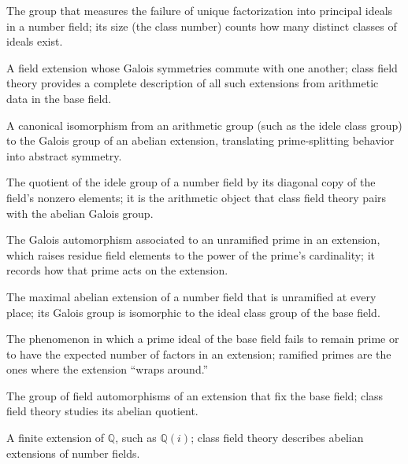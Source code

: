 \begin{description}[leftmargin=*,style=nextline,itemsep=0.3em]

\item[\textbf{Ideal class group.}] The group that measures the failure of unique factorization into principal ideals in a number field; its size (the class number) counts how many distinct classes of ideals exist.

\item[\textbf{Abelian extension.}] A field extension whose Galois symmetries commute with one another; class field theory provides a complete description of all such extensions from arithmetic data in the base field.

\item[\textbf{Reciprocity map.}] A canonical isomorphism from an arithmetic group (such as the idele class group) to the Galois group of an abelian extension, translating prime-splitting behavior into abstract symmetry.

\item[\textbf{Idele class group.}] The quotient of the idele group of a number field by its diagonal copy of the field's nonzero elements; it is the arithmetic object that class field theory pairs with the abelian Galois group.

\item[\textbf{Frobenius automorphism.}] The Galois automorphism associated to an unramified prime in an extension, which raises residue field elements to the power of the prime's cardinality; it records how that prime acts on the extension.

\item[\textbf{Hilbert class field.}] The maximal abelian extension of a number field that is unramified at every place; its Galois group is isomorphic to the ideal class group of the base field.

\item[\textbf{Ramification.}] The phenomenon in which a prime ideal of the base field fails to remain prime or to have the expected number of factors in an extension; ramified primes are the ones where the extension ``wraps around.''

\item[\textbf{Galois group.}] The group of field automorphisms of an extension that fix the base field; class field theory studies its abelian quotient.

\item[\textbf{Number field.}] A finite extension of $\mathbb Q$, such as $\mathbb Q(i)$; class field theory describes abelian extensions of number fields.


\end{description}
